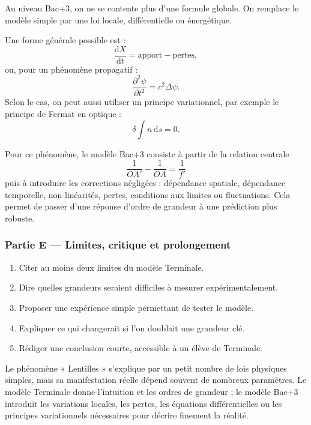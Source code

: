 \documentclass[11pt,a4paper]{article}
\begin{document}
\begin{approfondissementbox}
Au niveau Bac+3, on ne se contente plus d'une formule globale. On remplace le modèle simple par une loi locale, différentielle ou énergétique.

Une forme générale possible est :
\[
\frac{\mathrm d X}{\mathrm dt}=\text{apport}-\text{pertes},
\]
ou, pour un phénomène propagatif :
\[
\frac{\partial^2 \psi}{\partial t^2}=c^2\Delta\psi.
\]
Selon le cas, on peut aussi utiliser un principe variationnel, par exemple le principe de Fermat en optique :
\[
\delta \int n\,\mathrm ds=0.
\]

Pour ce phénomène, le modèle Bac+3 consiste à partir de la relation centrale
\[
\frac1{OA'}-\frac1{OA}=\frac1{f'}
\]
puis à introduire les corrections négligées : dépendance spatiale, dépendance temporelle, non-linéarités, pertes, conditions aux limites ou fluctuations. Cela permet de passer d'une réponse d'ordre de grandeur à une prédiction plus robuste.
\end{approfondissementbox}

\subsubsection*{Partie E — Limites, critique et prolongement}

\begin{enumerate}
  \item Citer au moins deux limites du modèle Terminale.
  \item Dire quelles grandeurs seraient difficiles à mesurer expérimentalement.
  \item Proposer une expérience simple permettant de tester le modèle.
  \item Expliquer ce qui changerait si l'on doublait une grandeur clé.
  \item Rédiger une conclusion courte, accessible à un élève de Terminale.
\end{enumerate}

\begin{corrigebox}
Le phénomène « Lentilles » s'explique par un petit nombre de lois physiques simples, mais sa manifestation réelle dépend souvent de nombreux paramètres. Le modèle Terminale donne l'intuition et les ordres de grandeur ; le modèle Bac+3 introduit les variations locales, les pertes, les équations différentielles ou les principes variationnels nécessaires pour décrire finement la réalité.
\end{corrigebox}
\end{document}
